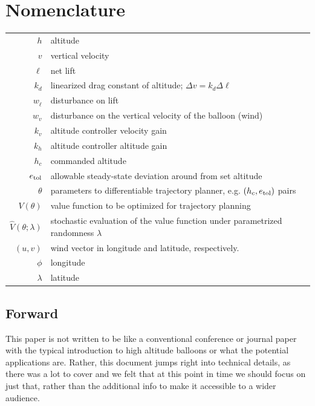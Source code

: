 \documentclass[11pt]{scrartcl} %
\begin{document}
\newcommand{\cf}{{\it cf.}}
\newcommand{\eg}{{\it e.g.}}
\newcommand{\ie}{{\it i.e.}}
\newcommand{\etc}{{\it etc.}}

\tableofcontents

\section*{Nomenclature}
\begin{tabular}{rl}
$h$ & altitude  \\
$v$ & vertical velocity\\
$\ell$ & net lift \\
$k_d$ & linearized drag constant of altitude; $\Delta v =k_d \Delta \ell$\\
$w_{\dot \ell}$ & disturbance on lift \\
$w_{v}$ & disturbance on the vertical velocity of the balloon (wind) \\
$k_v$ & altitude controller velocity gain \\
$k_h$ & altitude controller altitude gain \\
$h_c$ & commanded altitude \\
$e_{\mathrm{tol}}$ & allowable steady-state deviation around from set altitude \\ 
$\theta$ & parameters to differentiable trajectory planner, e.g. $(h_c,e_{\mathrm{tol}})$ pairs\\
$V(\theta)$ & value function to be optimized for trajectory planning \\
$\hat V(\theta; \lambda)$ & stochastic evaluation of the value function under parametrized randomness $\lambda$ \\
$(u,v)$ & wind vector in longitude and latitude, respectively.\\
$\phi$ & longitude \\
$\lambda$ & latitude \\
\end{tabular}

\subsection*{Forward}

This paper is not written to be like a conventional conference or journal paper with the typical introduction to high altitude balloons or what the potential applications are. Rather, this document jumps right into technical details, as there was a lot to cover and we felt that at this point in time we should focus on just that, rather than the additional info to make it accessible to a wider audience.
\end{document}
